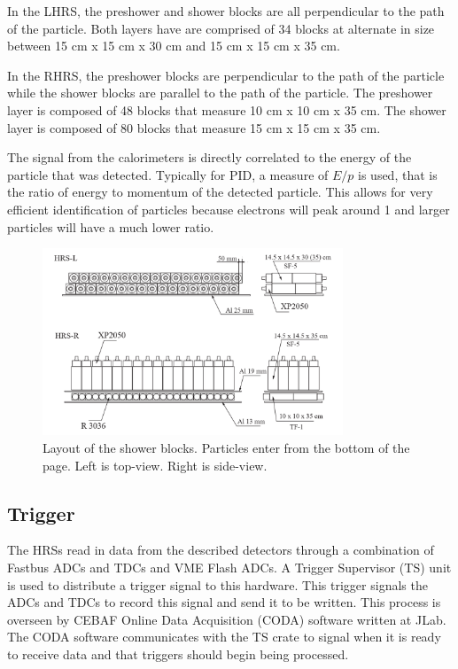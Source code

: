 In the LHRS, the preshower and shower blocks are all perpendicular to the path of the particle. Both layers have are comprised of 34 blocks at alternate in size between 15 cm x 15 cm x 30 cm and 15 cm x 15 cm x 35 cm.

In the RHRS, the preshower blocks are perpendicular to the path of the particle while the shower blocks are parallel to the path of the particle. The preshower layer is composed of 48 blocks that measure 10 cm x 10 cm x 35 cm. The shower layer is composed of 80 blocks that measure 15 cm x 15 cm x 35 cm.

The signal from the calorimeters is directly correlated to the energy of the particle that was detected. Typically for PID, a measure of $E/p$ is used, that is the ratio of energy to momentum of the detected particle. This allows for very efficient identification of particles because electrons will peak around 1 and larger particles will have a much lower ratio.

\begin{figure}
\begin{center}
	\includegraphics[width=0.8\textwidth]{./setup/fig/shower_layout.png}
	\caption{Layout of the shower blocks. Particles enter from the bottom of the page. Left is top-view. Right is side-view. \cite{HANIM}}
	\label{shower_layout}
\end{center}
\end{figure}

\subsection{Trigger}

The HRSs read in data from the described detectors through a combination of Fastbus ADCs and TDCs and VME Flash ADCs. A Trigger Supervisor (TS) unit is used to distribute a trigger signal to this hardware. This trigger signals the ADCs and TDCs to record this signal and send it to be written. This process is overseen by CEBAF Online Data Acquisition (CODA) software written at JLab. The CODA software communicates with the TS crate to signal when it is ready to receive data and that triggers should begin being processed.

